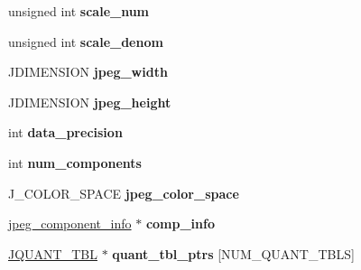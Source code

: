 \begin{DoxyCompactItemize}
\item 
\hypertarget{structjpeg__compress__struct_a16eb7e2e1ac30c42e8bd753bde43129c}{unsigned int {\bfseries scale\+\_\+num}}\label{structjpeg__compress__struct_a16eb7e2e1ac30c42e8bd753bde43129c}

\item 
\hypertarget{structjpeg__compress__struct_ab30f569483d6c25032aa2c18c885e91c}{unsigned int {\bfseries scale\+\_\+denom}}\label{structjpeg__compress__struct_ab30f569483d6c25032aa2c18c885e91c}

\item 
\hypertarget{structjpeg__compress__struct_ab433b317fcbe32212122621e476ac9d8}{J\+D\+I\+M\+E\+N\+S\+I\+O\+N {\bfseries jpeg\+\_\+width}}\label{structjpeg__compress__struct_ab433b317fcbe32212122621e476ac9d8}

\item 
\hypertarget{structjpeg__compress__struct_abc2cf065c0faab28327f7238949f76d3}{J\+D\+I\+M\+E\+N\+S\+I\+O\+N {\bfseries jpeg\+\_\+height}}\label{structjpeg__compress__struct_abc2cf065c0faab28327f7238949f76d3}

\item 
\hypertarget{structjpeg__compress__struct_a64c5b59e436f7d3d1d38b58d49993469}{int {\bfseries data\+\_\+precision}}\label{structjpeg__compress__struct_a64c5b59e436f7d3d1d38b58d49993469}

\item 
\hypertarget{structjpeg__compress__struct_a524f0284a6fcf96b21c8a745282c15e2}{int {\bfseries num\+\_\+components}}\label{structjpeg__compress__struct_a524f0284a6fcf96b21c8a745282c15e2}

\item 
\hypertarget{structjpeg__compress__struct_a7fb5305ec135340eddc2ebabec6a84d7}{J\+\_\+\+C\+O\+L\+O\+R\+\_\+\+S\+P\+A\+C\+E {\bfseries jpeg\+\_\+color\+\_\+space}}\label{structjpeg__compress__struct_a7fb5305ec135340eddc2ebabec6a84d7}

\item 
\hypertarget{structjpeg__compress__struct_a4d37d3f336cc11acafef541bf8ed38cc}{\hyperlink{structjpeg__component__info}{jpeg\+\_\+component\+\_\+info} $\ast$ {\bfseries comp\+\_\+info}}\label{structjpeg__compress__struct_a4d37d3f336cc11acafef541bf8ed38cc}

\item 
\hypertarget{structjpeg__compress__struct_a70a194c6a9c1744e1ed3a97232fb97f5}{\hyperlink{struct_j_q_u_a_n_t___t_b_l}{J\+Q\+U\+A\+N\+T\+\_\+\+T\+B\+L} $\ast$ {\bfseries quant\+\_\+tbl\+\_\+ptrs} \mbox{[}N\+U\+M\+\_\+\+Q\+U\+A\+N\+T\+\_\+\+T\+B\+L\+S\mbox{]}}\label{structjpeg__compress__struct_a70a194c6a9c1744e1ed3a97232fb97f5}


\end{DoxyCompactItemize}
